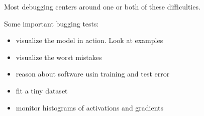 \documentclass[letterpaper, 12pt]{report}
\begin{document}
Most debugging centers around one or both of these difficulties.

Some important bugging tests: 

\begin{itemize}
\item visualize the model in action. Look at examples 
\item visualize the worst mistakes 
\item reason about software usin training and test error
\item fit a tiny dataset 
\item monitor histograms of activations and gradients 
\end{itemize}
\end{document}

